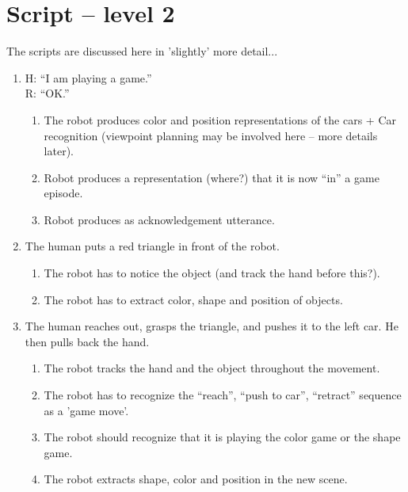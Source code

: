 \documentclass{article}
\begin{document}

\section{Script -- level 2}
The scripts are discussed here in 'slightly' more detail...

\begin{enumerate}
\item \label{lvl2:step1}
  H: ``I am playing a game.''\\
  R: ``OK.''
  \begin{enumerate}
  \item \label{lvl1:step1:detail0} The robot produces color and
    position representations of the cars + Car recognition (viewpoint
    planning may be involved here -- more details later).
  \item \label{lvl2:step1:detail1} Robot produces a representation
    (where?) that it is now ``in'' a game episode.
  \item \label{lvl2:step1:detail2} Robot produces as acknowledgement
    utterance.
  \end{enumerate}

\item \label{lvl2:step2}
  The human puts a red triangle in front of the robot.
  \begin{enumerate}
  \item \label{lvl2:step2:detail} The robot has to notice the object
    (and track the hand before this?).
  \item \label{lvl2:step2:detail2} The robot has to extract color,
    shape and position of objects.
  \end{enumerate}

\item \label{lvl2:step3}
  The human reaches out, grasps the triangle, and pushes it to the
  left car. He then pulls back the hand.
  \begin{enumerate}
  \item \label{lvl2:step3:detail1}
    The robot tracks the hand and the object throughout the movement.
  \item \label{lvl2:step3:detail2} The robot has to recognize the
    ``reach'', ``push to car'', ``retract'' sequence as a 'game
    move'.
  \item \label{lvl2:step3:detail3} The robot should recognize that it
    is playing the color game or the shape game.
  \item \label{lvl2:step3:detail4} The robot extracts shape, color and
    position in the new scene.
  \end{enumerate}


\end{enumerate}
\end{document}
